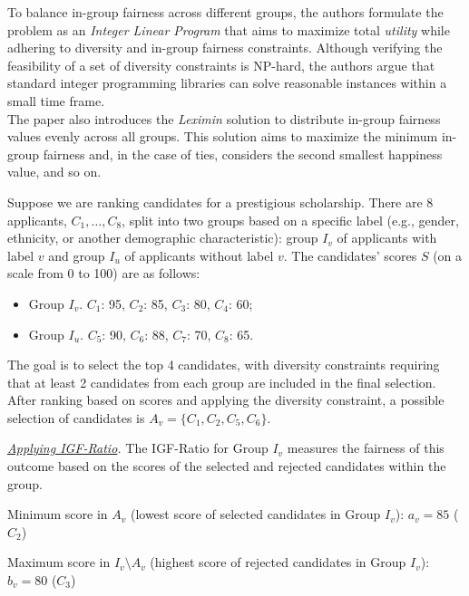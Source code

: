To balance in-group fairness across different groups, the authors formulate the problem as an \emph{Integer Linear Program} that aims to maximize total \emph{utility} while adhering to diversity and in-group fairness constraints. Although verifying the feasibility of a set of diversity constraints is NP-hard, the authors argue that standard integer programming libraries can solve reasonable instances within a small time frame.\\
The paper also introduces the \emph{Leximin} solution to distribute in-group fairness values evenly across all groups. This solution aims to maximize the minimum in-group fairness and, in the case of ties, considers the second smallest happiness value, and so on.

\begin{example}

Suppose we are ranking candidates for a prestigious scholarship. There are 8 applicants, $C_1, \ldots, C_8$, split into two groups based on a specific label (e.g., gender, ethnicity, or another demographic characteristic): group $I_v$ of applicants with label $v$ and group $I_u$ of applicants without label $v$. The candidates’ scores $S$ (on a scale from 0 to 100) are as follows: 
\begin{itemize}
    \item Group $I_v$. $C_1$: 95, $C_2$: 85, $C_3$: 80, $C_4$: 60;
    \item Group $I_u$. $C_5$: 90, $C_6$: 88, $C_7$: 70, $C_8$: 65.
\end{itemize}

The goal is to select the top 4 candidates, with diversity constraints requiring that at least 2 candidates from each group are included in the final selection. After ranking based on scores and applying the diversity constraint, a possible selection of candidates is $A_v=\{C_1,C_2,C_5,C_6\}$.


\noindent\emph{\underline{Applying IGF-Ratio}.}
%
The IGF-Ratio for Group $I_v$ measures the fairness of this outcome based on the scores of the selected and rejected candidates within the group. 

Minimum score in $A_v$ (lowest score of selected candidates in Group $I_v$): $a_v=85$ ($C_2$) 

Maximum score in $I_v\setminus A_v$ (highest score of rejected candidates in Group $I_v$): $b_v =80$ ($C_3$) 


\end{example}
